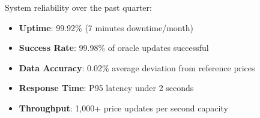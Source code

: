 System reliability over the past quarter:

\begin{itemize}
    \item \textbf{Uptime}: 99.92\% (7 minutes downtime/month)
    \item \textbf{Success Rate}: 99.98\% of oracle updates successful
    \item \textbf{Data Accuracy}: 0.02\% average deviation from reference prices
    \item \textbf{Response Time}: P95 latency under 2 seconds
    \item \textbf{Throughput}: 1,000+ price updates per second capacity
\end{itemize}

